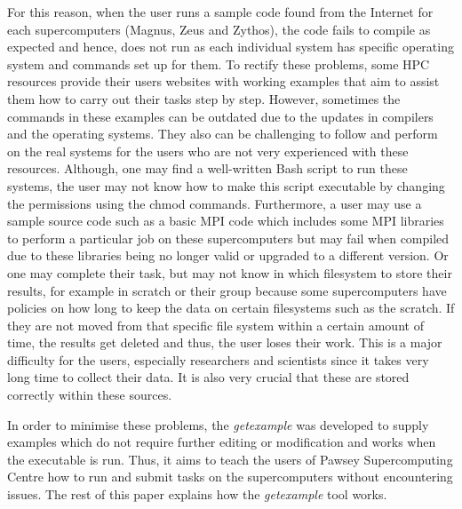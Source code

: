 For this reason, when the user runs a sample code found from the Internet for each supercomputers (Magnus, Zeus and Zythos), the code fails to compile 
as expected and hence, does not run as each individual system has specific operating system and commands set up for them. To rectify these problems, 
some HPC resources provide their users websites with working examples that aim to assist them how to carry out their tasks step by step. 
However, sometimes the commands in these examples can be outdated due to the updates in compilers and the operating systems. They also can be challenging 
to follow and perform on the real systems for the users who are not very experienced with these resources. Although, one may find a well-written Bash 
script to run these systems, the user may not know how to make this script executable by changing the permissions using the chmod commands. Furthermore, a user 
may use a sample source code such as a basic MPI code which includes some MPI libraries to perform a particular job on these supercomputers but may 
fail when compiled due to these libraries being no longer valid or upgraded to a different version. Or one may complete their task, but may 
not know in which filesystem to store their results, for example in scratch or their group because some supercomputers have policies on how long to keep 
the data on certain filesystems such as the scratch. If they are not moved from that specific file system within a certain amount of time, the results get 
deleted and thus, the user loses their work. This is a major difficulty for the users, especially researchers and scientists since it takes very long time 
to collect their data. It is also very crucial that these are stored correctly within these sources.

In order to minimise these problems, the \emph{getexample} was developed to supply examples which do not require further editing or modification and works
when the executable is run. Thus, it aims to teach the users of Pawsey Supercomputing Centre how to run and submit tasks on the supercomputers without 
encountering issues. The rest of this paper explains how the \emph{getexample} tool works.   




